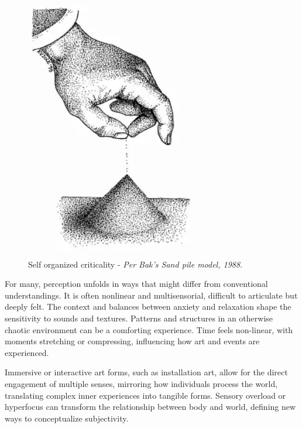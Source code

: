 \begin{figure}
    \centering
    \includegraphics[width=0.8\linewidth]{assets/sandpile.png} 
    \caption{\small Self organized criticality - \textit{Per Bak's Sand pile model, 1988}.}
    \label{fig:sandpile}
\end{figure}

For many, perception unfolds in ways that might differ from conventional understandings. It is often nonlinear and multisensorial, difficult to articulate but deeply felt. The context and balances between anxiety and relaxation shape the sensitivity to sounds and textures. Patterns and structures in an otherwise chaotic environment can be a comforting experience. Time feels non-linear, with moments stretching or compressing, influencing how art and events are experienced.

Immersive or interactive art forms, such as installation art, allow for the direct engagement of multiple senses, mirroring how individuals process the world, translating complex inner experiences into tangible forms. Sensory overload or hyperfocus can transform the relationship between body and world, defining new ways to conceptualize subjectivity.

